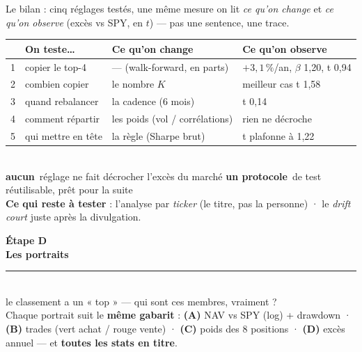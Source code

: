 \documentclass[11pt,aspectratio=169]{beamer}
\newcommand{\kpi}[3]{{\large\textbf{\textcolor{#1}{#2}}}~{\footnotesize #3}}
\begin{document}
\begin{frame}{Le bilan : cinq réglages testés, une même mesure}
  \centering
  {\footnotesize on lit \emph{ce qu'on change} et \emph{ce qu'on observe} (excès vs SPY, en $t$) — pas une sentence, une trace.}\\[2.5mm]
  {\footnotesize
  \begin{tabular}{@{}c l l l@{}}
    \toprule
     & On teste… & Ce qu'on change & Ce qu'on observe\\\midrule
    1 & copier le top-4 & --- (walk-forward, en parts) & $+3{,}1\,\%$/an, $\beta$ 1,20, t 0,94\\
    2 & combien copier & le nombre $K$ & meilleur cas t 1,58\\
    3 & quand rebalancer & la cadence (6 mois) & t 0,14\\
    4 & comment répartir & les poids (vol / corrélations) & rien ne décroche\\
    5 & qui mettre en tête & la règle (Sharpe brut) & t plafonne à 1,22\\
    \bottomrule
  \end{tabular}}\\[3mm]
  \kpi{grisC}{aucun}{réglage ne fait décrocher l'excès du marché}\hspace{7mm}%
  \kpi{helec}{un protocole}{de test réutilisable, prêt pour la suite}\\[2.5mm]
  {\footnotesize\color{black!60}\textbf{Ce qui reste à tester} : l'analyse par \emph{ticker} (le titre, pas la personne) · le \emph{drift court} juste après la divulgation.}
\end{frame}

\begin{frame}[plain]
  \centering\vfill
  {\color{helec!85}\large\textbf{Étape D}}\\[3mm]
  {\color{black!88}\fontsize{27}{31}\selectfont\textbf{Les portraits}}\\[3.5mm]
  {\color{helec!45}\rule{0.30\textwidth}{1.2pt}}\\[3.5mm]
  {\color{black!55}\large le classement a un « top » — qui sont ces membres, vraiment ?}\\[6mm]
  {\footnotesize\color{black!60} Chaque portrait suit le \textbf{même gabarit} : \textbf{(A)} NAV vs SPY (log) + drawdown · \textbf{(B)} trades (vert achat / rouge vente) · \textbf{(C)} poids des 8 positions · \textbf{(D)} excès annuel — et \textbf{toutes les stats en titre}.}
  \vfill
\end{frame}
\end{document}

